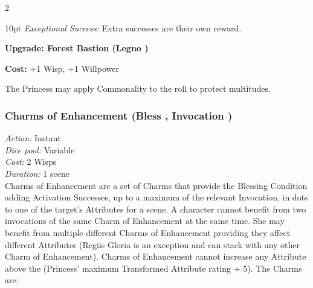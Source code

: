 \begin{multicols}{2}
\begin{myindentpar}{10pt}
\emph{Exceptional Success:} Extra successes are their own reward. 

\textbf{Upgrade: Forest Bastion (Legno \textbullet\textbullet\textbullet\textbullet)}

\textbf{Cost:} +1 Wisp, +1 Willpower

The Princess may apply Commonality to the roll to protect multitudes.

\end{myindentpar}

\subsubsection*{Charms of Enhancement (Bless \textbullet\textbullet\textbullet, Invocation \textbullet\textbullet)}

\emph{Action:} Instant \\ 

\emph{Dice pool:} Variable \\

\emph{Cost:} 2 Wisps\\

\emph{Duration:} 1 scene\\

\noindent Charms of Enhancement are a set of Charms that provide the Blessing Condition adding Activation Successes, up to a maximum of the relevant Invocation, in dots to one of the target's Attributes for a scene. A character cannot benefit from two invocations of the same Charm of Enhancement at the same time. She may benefit from multiple different Charms of Enhancement providing they affect different Attributes (Regiis Gloria is an exception and can stack with any other Charm of Enhancement). Charms of Enhancement cannot increase any Attribute above the (Princess' maximum Transformed Attribute rating + 5). The Charms are: 


\end{multicols}
